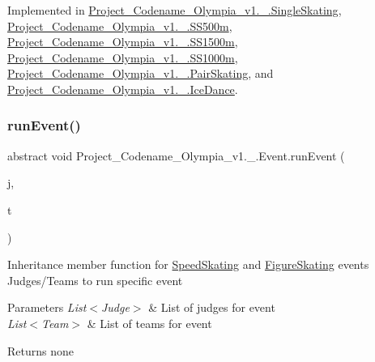 Implemented in \hyperlink{classProject__Codename__Olympia__v1_1_1__0_1_1SingleSkating_a651ceefab408b4cbe3106ed7d673ba79}{Project\+\_\+\+Codename\+\_\+\+Olympia\+\_\+v1.\+\_.\+Single\+Skating}, \hyperlink{classProject__Codename__Olympia__v1_1_1__0_1_1SS500m_a7b5584a50c59e67457f86ebd38b8e4a8}{Project\+\_\+\+Codename\+\_\+\+Olympia\+\_\+v1.\+\_.\+S\+S500m}, \hyperlink{classProject__Codename__Olympia__v1_1_1__0_1_1SS1500m_a012967ff7e84eb9d1578705ad465aecc}{Project\+\_\+\+Codename\+\_\+\+Olympia\+\_\+v1.\+\_.\+S\+S1500m}, \hyperlink{classProject__Codename__Olympia__v1_1_1__0_1_1SS1000m_aea0a2bb558a0b5f1ee0cae54a9e12ea9}{Project\+\_\+\+Codename\+\_\+\+Olympia\+\_\+v1.\+\_.\+S\+S1000m}, \hyperlink{classProject__Codename__Olympia__v1_1_1__0_1_1PairSkating_a22c797f9392cc5e53c9cbacb641e56e0}{Project\+\_\+\+Codename\+\_\+\+Olympia\+\_\+v1.\+\_.\+Pair\+Skating}, and \hyperlink{classProject__Codename__Olympia__v1_1_1__0_1_1IceDance_a075d8dca89d1ed4399ffb7c4d9825ff1}{Project\+\_\+\+Codename\+\_\+\+Olympia\+\_\+v1.\+\_.\+Ice\+Dance}.

\mbox{\label{classProject__Codename__Olympia__v1_1_1__0_1_1Event_ac6ff060da23153c02da49937dcf9f326}} 
\subsubsection{\texorpdfstring{run\+Event()}{runEvent()}}
{\footnotesize\ttfamily abstract void Project\+\_\+\+Codename\+\_\+\+Olympia\+\_\+v1.\+\_.\+Event.\+run\+Event (\begin{DoxyParamCaption}\item[{List$<$ \hyperlink{classProject__Codename__Olympia__v1_1_1__0_1_1Judge}{Judge} $>$}]{j,  }\item[{List$<$ \hyperlink{classProject__Codename__Olympia__v1_1_1__0_1_1Team}{Team} $>$}]{t }\end{DoxyParamCaption})\hspace{0.3cm}{\ttfamily [pure virtual]}}

Inheritance member function for \hyperlink{classProject__Codename__Olympia__v1_1_1__0_1_1SpeedSkating}{Speed\+Skating} and \hyperlink{classProject__Codename__Olympia__v1_1_1__0_1_1FigureSkating}{Figure\+Skating} events Judges/\+Teams to run specific event 
\begin{DoxyParams}{Parameters}
{\em List$<$\+Judge$>$} & List of judges for event \\
\hline
{\em List$<$\+Team$>$} & List of teams for event \\
\hline
\end{DoxyParams}
\begin{DoxyReturn}{Returns}
none 
\end{DoxyReturn}


